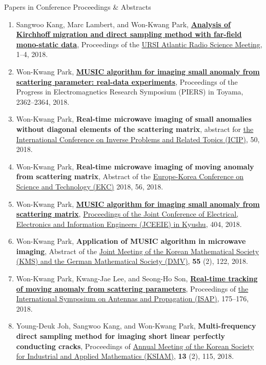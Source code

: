 \documentclass{resume} %
\begin{document}
\begin{rSection}{Papers in Conference Proceedings \& Abstracts}
\begin{enumerate}
\item\label{C-ATRASC2018} Sangwoo Kang, Marc Lambert, and Won-Kwang Park, \href{https://ieeexplore.ieee.org/document/8471469}{\textbf{Analysis of Kirchhoff migration and direct sampling method with far-field mono-static data}}, Proceedings of the \href{http://www.atrasc.com/homepage.php}{ URSI Atlantic Radio Science Meeting}, 1--4, 2018.
\item\label{C-PIERS2018} Won-Kwang Park, \href{https://doi.org/10.23919/PIERS.2018.8598183}{\textbf{MUSIC algorithm for imaging small anomaly from scattering parameter: real-data experiments}}, Proceedings of the Progress in Electromagnetics Research Symposium (PIERS) in Toyama, 2362--2364, 2018.
\item\label{C-ICIP2018} Won-Kwang Park, \textbf{Real-time microwave imaging of small anomalies without diagonal elements of the scattering matrix}, abstract for \href{https://www.ece.nus.edu.sg/stfpage/elechenx/Conference/index.htm}{the  International Conference on Inverse Problems and Related Topics (ICIP)}, 50, 2018.
\item\label{C-EKC2018} Won-Kwang Park, \textbf{Real-time microwave imaging of moving anomaly from scattering matrix}, Abstract of the \href{http://www.ekc2018.org/data/EKC2018-Proceedings.zip}{Europe-Korea Conference on Science and Technology (EKC)} 2018, 56, 2018.
\item\label{C-JCEEIE2018} Won-Kwang Park, \href{https://doi.org/10.11527/jceeek.2018.0_404}{\textbf{MUSIC algorithm for imaging small anomaly from scattering matrix}}, \href{https://www.jstage.jst.go.jp/browse/jceeek/2018/0/_contents/-char/en}{Proceedings of the  Joint Conference of Electrical, Electronics and Information Engineers (JCEEIE) in Kyushu}, 404, 2018.
\item\label{C-KMS2018} Won-Kwang Park, \textbf{Application of MUSIC algorithm in microwave imaging}, Abstract of the \href{http://www.kms.or.kr/KMS-DMV/}{Joint Meeting of the Korean Mathematical Society (KMS) and the German Mathematical Society (DMV)}, \textbf{55} (2), 122, 2018.
\item\label{C-ISAP2018} Won-Kwang Park, Kwang-Jae Lee, and Seong-Ho Son, \href{https://ieeexplore.ieee.org/document/8627499}{\textbf{Real-time tracking of moving anomaly from scattering parameters}}, Proceedings of \href{http://isap2018.org}{the International Symposium on Antennas and Propagation (ISAP)}, 175--176, 2018.
\item\label{C-KSIAM2018} Young-Deuk Joh, Sangwoo Kang, and Won-Kwang Park, \textbf{Multi-frequency direct sampling method for imaging short linear perfectly conducting cracks}, Proceedings of \href{https://www.ksiam.org/conference/3cbf86f3-4131-440b-a6f6-407c6c52edbf/welcome}{Annual Meeting of the Korean Society for Industrial and Applied Mathematics (KSIAM)}, \textbf{13} (2), 115, 2018.

\end{enumerate}
\end{rSection}
\end{document}
